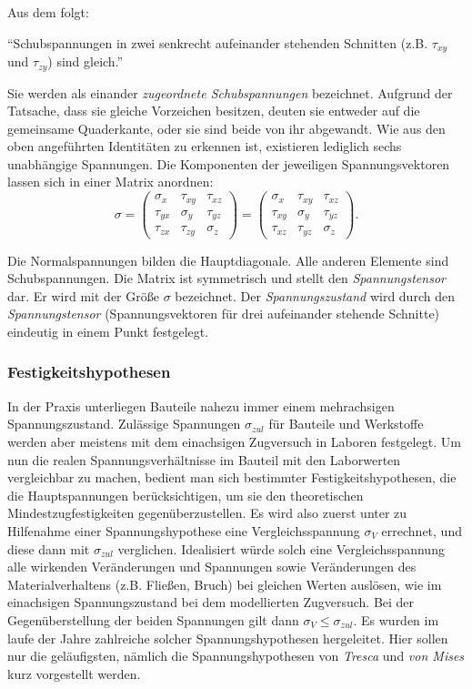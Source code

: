 \documentclass[12pt,a4paper,parskip,twoside,BCOR5mm,headsepline]{scrartcl}
\begin{document}
\begin{description*}
\begin{itemize*}
Aus dem folgt:

"`Schubspannungen in zwei senkrecht aufeinander stehenden Schnitten (z.B. $\tau_{xy}$ und $\tau_{zy}$) sind gleich."' \autocite[46]{tmr}

Sie werden als einander \emph{zugeordnete Schubspannungen} bezeichnet. Aufgrund der Tatsache,  dass sie gleiche Vorzeichen besitzen, deuten sie entweder auf die gemeinsame Quaderkante,  oder sie sind beide von ihr abgewandt. Wie aus den oben angeführten Identitäten zu erkennen ist, existieren lediglich sechs unabhängige Spannungen. Die Komponenten der jeweiligen Spannungsvektoren lassen sich in einer Matrix anordnen:
\begin{equation}
\sigma = \begin{pmatrix}
\sigma_x & \tau_{xy} & \tau_{xz}\\
\tau_{yx} & \sigma_y & \tau_{yz}\\
\tau_{zx} & \tau_{zy} & \sigma_z
\end{pmatrix} = \begin{pmatrix}
\sigma_x & \tau_{xy} & \tau_{xz}\\
\tau_{xy} & \sigma_y & \tau_{yz}\\
\tau_{xz} & \tau_{yz} & \sigma_z
\end{pmatrix}
.\end{equation}

Die Normalspannungen bilden die Hauptdiagonale. Alle anderen Elemente sind Schubspannungen. Die Matrix ist symmetrisch und stellt den \emph{Spannungstensor} dar. Er wird mit der Größe $ \sigma $ bezeichnet. Der \emph{Spannungszustand} wird durch den \emph{Spannungstensor} (Spannungsvektoren für drei aufeinander stehende Schnitte) eindeutig in einem Punkt festgelegt.   \autocite[43-46]{tmr}
\subsubsection{Festigkeitshypothesen}
In der Praxis unterliegen Bauteile nahezu immer einem mehrachsigen Spannungszustand. Zulässige Spannungen $ \sigma_{zul} $ für Bauteile und Werkstoffe werden aber meistens mit dem einachsigen Zugversuch in Laboren festgelegt. Um nun die realen Spannungsverhältnisse im Bauteil mit den Laborwerten vergleichbar zu machen,  bedient man sich bestimmter Festigkeitshypothesen, die die Hauptspannungen berücksichtigen,  um sie  den theoretischen Mindestzugfestigkeiten gegenüberzustellen. Es wird also zuerst unter zu Hilfenahme einer Spannungshypothese eine Vergleichsspannung $ \sigma_V $ errechnet,  und diese dann mit $ \sigma_{zul} $ verglichen. Idealisiert würde solch eine Vergleichsspannung alle wirkenden Veränderungen und Spannungen sowie Veränderungen des Materialverhaltens (z.B. Fließen, Bruch) bei gleichen Werten auslösen,  wie im einachsigen Spannungszustand bei dem modellierten Zugversuch. Bei der Gegenüberstellung der beiden Spannungen gilt dann $ \sigma_V \leq \sigma_{zul} $. Es wurden im laufe der Jahre zahlreiche solcher Spannungshypothesen hergeleitet. \autocite[399]{dd} Hier sollen nur die geläufigsten, nämlich die Spannungshypothesen von  \emph{Tresca} und \emph{von Mises} kurz vorgestellt werden.


\end{itemize*}
\end{description*}
\end{document}
